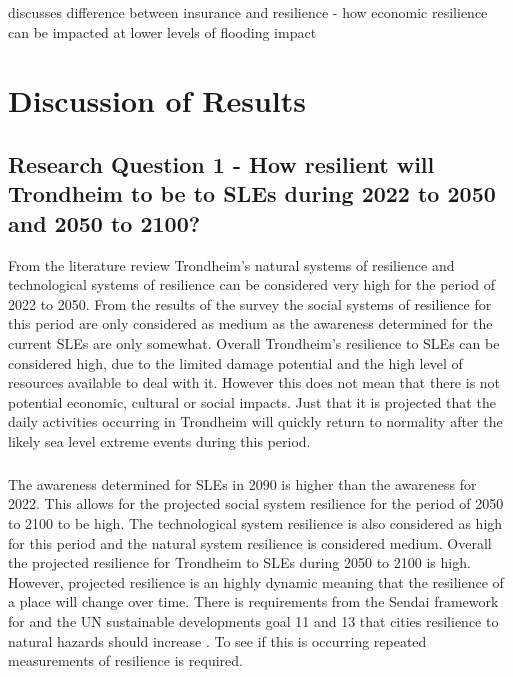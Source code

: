 



\cite{cutter_community_2020} discusses difference between insurance and resilience - how economic resilience can be impacted at lower levels of flooding impact

\chapter{Discussion of Results}

\section{Research Question 1 - How resilient will Trondheim to be to SLEs during 2022 to 2050 and 2050 to 2100? }

From the literature review Trondheim's natural systems of resilience and technological systems of resilience can be considered very high for the period of 2022 to 2050. From the results of the survey the  social systems of resilience for this period are only considered as medium as the awareness determined for the current SLEs are only somewhat. Overall Trondheim's resilience to SLEs can be considered high, due to the limited damage potential and the high level of resources available to deal with it. However this does not mean that there is not potential economic, cultural or social impacts. Just that it is projected that the daily activities occurring in Trondheim will quickly return to normality after the likely sea level extreme events during this period.
\paragraph{}
The awareness determined for SLEs in 2090 is higher than the awareness for 2022. This allows for the projected social system resilience for the period of 2050 to 2100 to be high. The technological system resilience is also considered as high for this period and the natural system resilience is considered medium. Overall the projected resilience for Trondheim to SLEs during 2050 to 2100 is high. However, projected resilience is an highly dynamic meaning that the resilience of a place will change over time. There is requirements from the Sendai framework for and the UN sustainable developments goal 11 and 13 that cities resilience to natural hazards should increase \cite{gonzalez-riancho_storm_2017}. To see if this is occurring repeated measurements of resilience is required. 

